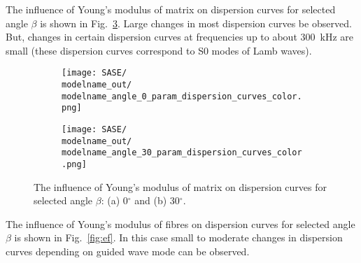 \documentclass[preprint,12pt]{elsarticle}
\begin{document}
The influence of Young's modulus of matrix on dispersion curves for selected angle 
\(\beta\) is shown in Fig.~\ref{fig:em}. Large changes in most dispersion curves be 
observed. But, changes in certain dispersion curves at frequencies up to about 
300~kHz are small (these dispersion curves correspond to S0 modes of Lamb waves).

\begin{figure} [h!]
	\centering
	\newcommand{\modelname}{SASE4_plain_weave}
	\begin{subfigure}[b]{0.49\textwidth}
		\centering
		
		
\texttt{[image: SASE/\\modelname\_out/\\modelname\_angle\_0\_param\_dispersion\_curves\_color.png]}
		\caption{}
		\label{fig:em0}
	\end{subfigure}
	\hfill
	\begin{subfigure}[b]{0.49\textwidth}
		\centering
		
		
\texttt{[image: SASE/\\modelname\_out/\\modelname\_angle\_30\_param\_dispersion\_curves\_color.png]}
		\caption{}
		\label{fig:em30}
	\end{subfigure}

	\caption{The influence of Young's modulus of matrix  on dispersion curves for 
	selected angle \(\beta\): (a) 0\(^{\circ}\) and (b) 30\(^{\circ}\).} 
	\label{fig:em}
\end{figure}

The influence of Young's modulus of fibres on dispersion curves for selected angle 
\(\beta\) is shown in Fig.~\ref{fig:ef}. In this case small to moderate changes in 
dispersion curves depending on guided wave mode can be observed. 
\end{document}
